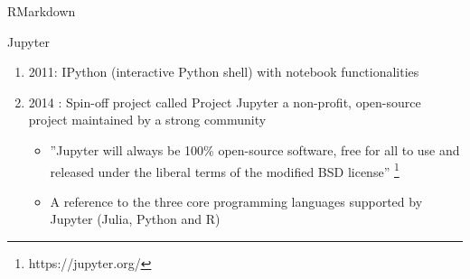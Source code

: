 \begin{frame}{RMarkdown}
\end{frame}

\begin{frame}[<+->]{Jupyter}
\begin{enumerate}
	\item 2011:  IPython (interactive Python shell) with notebook functionalities
	\item 2014 : Spin-oﬀ project called Project Jupyter a non-proﬁt, open-source project maintained by a strong community
		\begin{itemize}
		\item ”Jupyter will always be 100\% open-source software, free for all to use and released under the liberal terms of the modiﬁed BSD license”
		\footnote{https://jupyter.org/}
		\item A reference to the three core programming languages supported by Jupyter (Julia, Python and R)
		\end{itemize}
\end{enumerate}
\end{frame}


